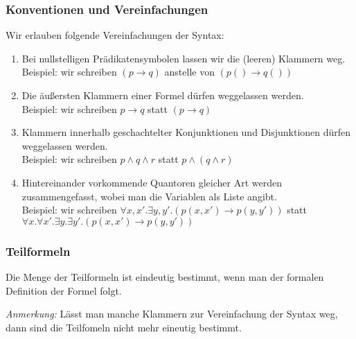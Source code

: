 \documentclass[onlymath]{beamer}
\begin{document}
\begin{frame}\frametitle{Konventionen und Vereinfachungen}

Wir erlauben folgende \alert{Vereinfachungen der Syntax:}\pause
\begin{enumerate}[(1)]
\item Bei nullstelligen Prädikatensymbolen lassen wir die (leeren) Klammern weg.\\
Beispiel: wir schreiben $(p\to q)$ anstelle von $(p()\to q())$\pause
%
\item Die äußersten Klammern einer Formel dürfen weggelassen werden.\\
Beispiel: wir schreiben $p\to q$ statt $(p\to q)$\pause
%
\item Klammern innerhalb geschachtelter Konjunktionen und Disjunktionen dürfen
weggelassen werden.\\
Beispiel: wir schreiben $p\wedge q\wedge r$ statt $p\wedge (q\wedge r)$\pause
%
\item Hintereinander vorkommende Quantoren gleicher Art werden zusammengefasst, wobei man die Variablen als Liste angibt.\\
Beispiel: wir schreiben $\forall x,x'.\exists y,y'.(p(x,x')\to p(y,y'))$ statt $\forall x.\forall x'.\exists y.\exists y'.(p(x,x')\to p(y,y'))$\pause
\end{enumerate}


\end{frame}


\begin{frame}\frametitle{Teilformeln}


Die Menge der Teilformeln ist eindeutig bestimmt, wenn man der formalen 
Definition der Formel folgt.


\pause\emph{Anmerkung:} Lässt man manche Klammern zur Vereinfachung der Syntax weg, dann 
sind die Teilfomeln nicht mehr eineutig bestimmt.


\end{frame}
\end{document}
